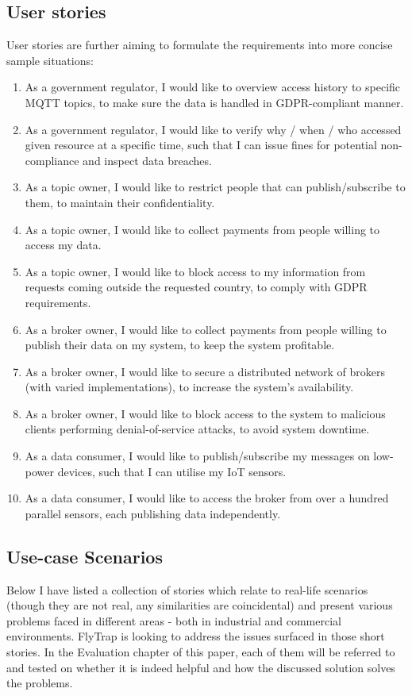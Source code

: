 \subsection{User stories}
User stories are further aiming to formulate the requirements into more concise sample situations:
\begin{enumerate}
\item As a government regulator, I would like to overview access history to specific MQTT topics, to make sure the data is handled in GDPR-compliant manner.
\item As a government regulator, I would like to verify why / when / who accessed given resource at a specific time, such that I can issue fines for potential non-compliance and inspect data breaches.
\item As a topic owner, I would like to restrict people that can publish/subscribe to them, to maintain their confidentiality.
\item As a topic owner, I would like to collect payments from people willing to access my data.
\item As a topic owner, I would like to block access to my information from requests coming outside the requested country, to comply with GDPR requirements.
\item As a broker owner, I would like to collect payments from people willing to publish their data on my system, to keep the system profitable.
\item As a broker owner, I would like to secure a distributed network of brokers (with varied implementations), to increase the system's availability. 
\item As a broker owner, I would like to block access to the system to malicious clients performing denial-of-service attacks, to avoid system downtime.
\item As a data consumer, I would like to publish/subscribe my messages on low-power devices, such that I can utilise my IoT sensors.
\item As a data consumer, I would like to access the broker from over a hundred parallel sensors, each publishing data independently.
\end{enumerate}

\subsection{Use-case Scenarios}
Below I have listed a collection of stories which relate to real-life scenarios (though they are not real, any similarities are coincidental) and present various problems faced in different areas - both in industrial and commercial environments. FlyTrap is looking to address the issues surfaced in those short stories. In the Evaluation chapter of this paper, each of them will be referred to and tested on whether it is indeed helpful and how the discussed solution solves the problems.
\\
